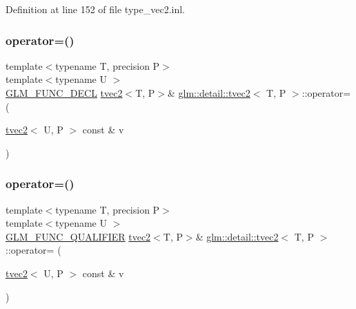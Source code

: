 Definition at line 152 of file type\+\_\+vec2.\+inl.

\mbox{\label{structglm_1_1detail_1_1tvec2_ac45d730db8173a1fe3b738bf4ac07fb3}} 
\subsubsection{\texorpdfstring{operator=()}{operator=()}\hspace{0.1cm}{\footnotesize\ttfamily [2/3]}}
{\footnotesize\ttfamily template$<$typename T, precision P$>$ \\
template$<$typename U $>$ \\
\hyperlink{setup_8hpp_ab2d052de21a70539923e9bcbf6e83a51}{G\+L\+M\+\_\+\+F\+U\+N\+C\+\_\+\+D\+E\+CL} \hyperlink{structglm_1_1detail_1_1tvec2}{tvec2}$<$T, P$>$\& \hyperlink{structglm_1_1detail_1_1tvec2}{glm\+::detail\+::tvec2}$<$ T, P $>$\+::operator= (\begin{DoxyParamCaption}\item[{\hyperlink{structglm_1_1detail_1_1tvec2}{tvec2}$<$ U, P $>$ const \&}]{v }\end{DoxyParamCaption})}

\mbox{\label{structglm_1_1detail_1_1tvec2_ac89b8aa7379fe8d552c555d6791a8ae1}} 
\subsubsection{\texorpdfstring{operator=()}{operator=()}\hspace{0.1cm}{\footnotesize\ttfamily [3/3]}}
{\footnotesize\ttfamily template$<$typename T, precision P$>$ \\
template$<$typename U $>$ \\
\hyperlink{setup_8hpp_a33fdea6f91c5f834105f7415e2a64407}{G\+L\+M\+\_\+\+F\+U\+N\+C\+\_\+\+Q\+U\+A\+L\+I\+F\+I\+ER} \hyperlink{structglm_1_1detail_1_1tvec2}{tvec2}$<$T, P$>$\& \hyperlink{structglm_1_1detail_1_1tvec2}{glm\+::detail\+::tvec2}$<$ T, P $>$\+::operator= (\begin{DoxyParamCaption}\item[{\hyperlink{structglm_1_1detail_1_1tvec2}{tvec2}$<$ U, P $>$ const \&}]{v }\end{DoxyParamCaption})}



